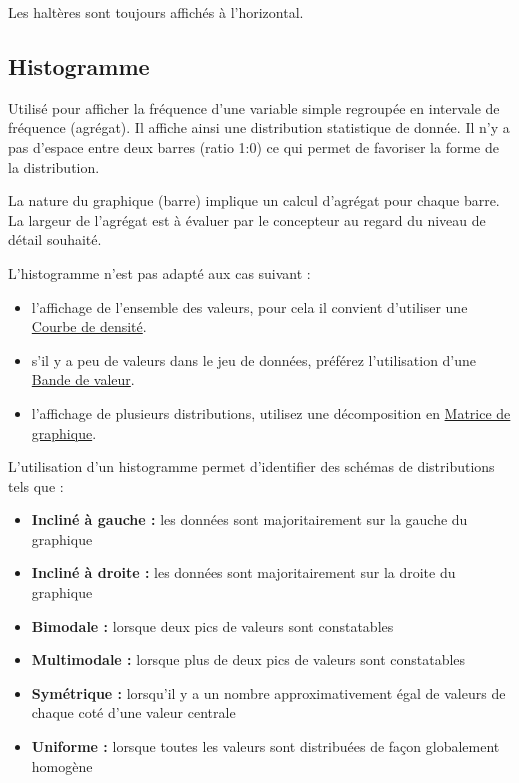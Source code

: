 \documentclass[a4paper,12pt]{article}
\begin{document}
\begin{multicols}{2}
Les haltères sont toujours affichés à l'horizontal.
\subsection*{Histogramme}
\label{sec:org0e436e2}
Utilisé pour afficher la fréquence d'une variable simple regroupée en intervale de fréquence (agrégat).\autocite{sosulskiGraphics2019} Il affiche ainsi une distribution statistique de donnée. Il n'y a pas d'espace entre deux barres (ratio 1:0) ce qui permet de favoriser la forme de la distribution. \autocite{alansmithLexiqueVisuel}

La nature du graphique (barre) implique un calcul d'agrégat pour chaque barre. \autocite{wilkeVisualizingDistributionsHistograms2019} La largeur de l'agrégat est à évaluer par le concepteur au regard du niveau de détail souhaité.\autocite{wilkeVisualizingDistributionsHistograms2019}

L'histogramme n'est pas adapté aux cas suivant :
\begin{itemize}
\item l'affichage de l'ensemble des valeurs, pour cela il convient d'utiliser une \hyperref[sec:org8eaadff]{Courbe de densité}. \autocite{wilkeVisualizingDistributionsHistograms2019}
\item s'il y a peu de valeurs dans le jeu de données, \autocite{weissgerberBarLineGraphs2015} préférez l'utilisation d'une \hyperref[sec:org5c08acc]{Bande de valeur}.
\item l'affichage de plusieurs distributions,\autocite{wilkeVisualizingDistributionsHistograms2019} utilisez une décomposition en \hyperref[sec:org4b7bab9]{Matrice de graphique}.
\end{itemize}

L'utilisation d'un histogramme permet d'identifier des schémas de distributions tels que : \autocite{jonathanschwabishDistribution2021}
\begin{itemize}
\item \textbf{Incliné à gauche :} les données sont majoritairement sur la gauche du graphique
\item \textbf{Incliné à droite :} les données sont majoritairement sur la droite du graphique
\item \textbf{Bimodale :} lorsque deux pics de valeurs sont constatables
\item \textbf{Multimodale :} lorsque plus de deux pics de valeurs sont constatables
\item \textbf{Symétrique :} lorsqu'il y a un nombre approximativement égal de valeurs de chaque coté d'une valeur centrale
\item \textbf{Uniforme :} lorsque toutes les valeurs sont distribuées de façon globalement homogène
\end{itemize}

\end{multicols}
\end{document}

